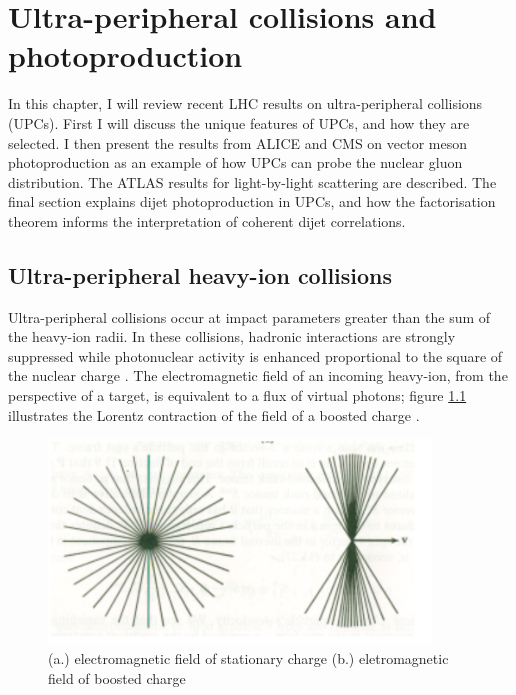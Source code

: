 \setlength\abovedisplayskip{0.4pt}
\setlength\belowdisplayskip{0.4pt}

\chapter{Ultra-peripheral collisions and photoproduction}

In this chapter, I will review recent LHC results on ultra-peripheral collisions (UPCs). First I will discuss the unique features of UPCs, and how they are selected. I then present the results from ALICE and CMS on vector meson photoproduction as an example of how UPCs can probe the nuclear gluon distribution. The ATLAS results for light-by-light scattering are described. The final section explains dijet photoproduction in UPCs, and how the factorisation theorem informs the interpretation of coherent dijet correlations. 

\section{Ultra-peripheral heavy-ion collisions}

Ultra-peripheral collisions occur at impact parameters greater than the sum of the heavy-ion radii. In these collisions, hadronic interactions are strongly suppressed while photonuclear activity is enhanced proportional to the square of the nuclear charge \cite{Hands:2001ve}. The electromagnetic field of an incoming heavy-ion, from the perspective of a target, is equivalent to a flux of virtual photons; figure \ref{fig:smushedField} illustrates the Lorentz contraction of the field of a boosted charge \cite{Baltz:2007kq}\cite{WWJackson}.
\begin{figure}[h!]
\begin{centering}
\includegraphics[width=4in]{Chapter1/importfigs/jackson_em_wwa.png}
\par\end{centering}
\caption{ (a.) electromagnetic field of stationary charge (b.) eletromagnetic field of boosted charge \cite{WWJackson} \label{fig:smushedField}}
\end{figure}

